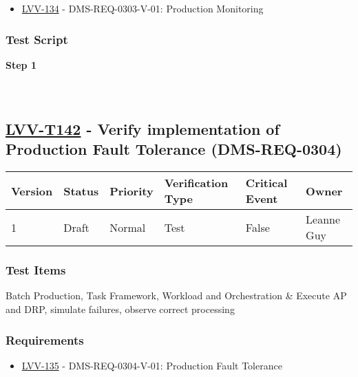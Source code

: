 \begin{itemize}
\tightlist
\item
  \href{https://jira.lsstcorp.org/browse/LVV-134}{LVV-134} -
  DMS-REQ-0303-V-01: Production Monitoring
\end{itemize}

\hypertarget{test-script-118}{%
\subsubsection{Test Script}\label{test-script-118}}

\textbf{Step 1}\\
~\\
~\\

\hypertarget{lvv-t142---verify-implementation-of-production-fault-tolerance-dms-req-0304}{%
\subsection{\texorpdfstring{\href{https://jira.lsstcorp.org/secure/Tests.jspa\#/testCase/LVV-T142}{LVV-T142}
- Verify implementation of Production Fault Tolerance
(DMS-REQ-0304)}{LVV-T142 - Verify implementation of Production Fault Tolerance (DMS-REQ-0304)}}\label{lvv-t142---verify-implementation-of-production-fault-tolerance-dms-req-0304}}

\begin{longtable}[]{@{}llllll@{}}
\toprule
Version & Status & Priority & Verification Type & Critical Event &
Owner\tabularnewline
\midrule
\endhead
1 & Draft & Normal & Test & False & Leanne Guy\tabularnewline
\bottomrule
\end{longtable}

\hypertarget{test-items-118}{%
\subsubsection{Test Items}\label{test-items-118}}

Batch Production, Task Framework, Workload and Orchestration \& Execute
AP and DRP, simulate failures, observe correct processing

\hypertarget{requirements-119}{%
\subsubsection{Requirements}\label{requirements-119}}

\begin{itemize}
\tightlist
\item
  \href{https://jira.lsstcorp.org/browse/LVV-135}{LVV-135} -
  DMS-REQ-0304-V-01: Production Fault Tolerance
\end{itemize}

